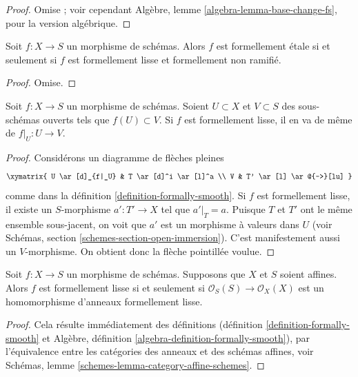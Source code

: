 \begin{proof}
Omise ; voir cependant Algèbre, lemme \ref{algebra-lemma-base-change-fs},
pour la version algébrique.
\end{proof}

\begin{lemma}
\label{lemma-formally-etale-unramified-smooth}
Soit $f : X \to S$ un morphisme de schémas.
Alors $f$ est formellement étale si et seulement si
$f$ est formellement lisse et formellement non ramifié.
\end{lemma}

\begin{proof}
Omise.
\end{proof}

\begin{lemma}
\label{lemma-formally-smooth-on-opens}
Soit $f : X \to S$ un morphisme de schémas.
Soient $U \subset X$ et $V \subset S$ des sous-schémas ouverts tels que
$f(U) \subset V$. Si $f$ est formellement lisse, il en va de même de $f|_U : U \to V$.
\end{lemma}

\begin{proof}
Considérons un diagramme de flèches pleines
$$
\xymatrix{
U \ar[d]_{f|_U} & T \ar[d]^i \ar[l]^a \\
V & T' \ar[l] \ar@{-->}[lu]
}
$$
comme dans la définition \ref{definition-formally-smooth}. Si $f$ est formellement
lisse, il existe un $S$-morphisme $a' : T' \to X$ tel que
$a'|_T = a$. Puisque $T$ et $T'$ ont le même ensemble sous-jacent,
on voit que $a'$ est un morphisme à valeurs dans $U$ (voir Schémas, section
\ref{schemes-section-open-immersion}). C'est manifestement aussi un $V$-morphisme.
On obtient donc la flèche pointillée voulue.
\end{proof}

\begin{lemma}
\label{lemma-affine-formally-smooth}
Soit $f : X \to S$ un morphisme de schémas.
Supposons que $X$ et $S$ soient affines.
Alors $f$ est formellement lisse si et seulement si
$\mathcal{O}_S(S) \to \mathcal{O}_X(X)$ est un homomorphisme d'anneaux
formellement lisse.
\end{lemma}

\begin{proof}
Cela résulte immédiatement des définitions
(définition \ref{definition-formally-smooth} et
Algèbre, définition \ref{algebra-definition-formally-smooth}),
par l'équivalence entre les catégories des anneaux et des schémas affines,
voir
Schémas, lemme \ref{schemes-lemma-category-affine-schemes}.
\end{proof}

